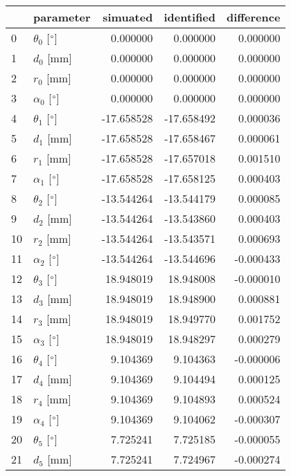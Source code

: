 \documentclass{standalone}%
\begin{document}
%
\normalsize%
\begin{tabular}{llrrr}
\toprule
{} &                 parameter &   simuated & identified & difference \\
\midrule
0  &  $\theta_{0}$ [$\degree$] &   0.000000 &   0.000000 &   0.000000 \\
1  &              $d_{0}$ [mm] &   0.000000 &   0.000000 &   0.000000 \\
2  &              $r_{0}$ [mm] &   0.000000 &   0.000000 &   0.000000 \\
3  &  $\alpha_{0}$ [$\degree$] &   0.000000 &   0.000000 &   0.000000 \\
4  &  $\theta_{1}$ [$\degree$] & -17.658528 & -17.658492 &   0.000036 \\
5  &              $d_{1}$ [mm] & -17.658528 & -17.658467 &   0.000061 \\
6  &              $r_{1}$ [mm] & -17.658528 & -17.657018 &   0.001510 \\
7  &  $\alpha_{1}$ [$\degree$] & -17.658528 & -17.658125 &   0.000403 \\
8  &  $\theta_{2}$ [$\degree$] & -13.544264 & -13.544179 &   0.000085 \\
9  &              $d_{2}$ [mm] & -13.544264 & -13.543860 &   0.000403 \\
10 &              $r_{2}$ [mm] & -13.544264 & -13.543571 &   0.000693 \\
11 &  $\alpha_{2}$ [$\degree$] & -13.544264 & -13.544696 &  -0.000433 \\
12 &  $\theta_{3}$ [$\degree$] &  18.948019 &  18.948008 &  -0.000010 \\
13 &              $d_{3}$ [mm] &  18.948019 &  18.948900 &   0.000881 \\
14 &              $r_{3}$ [mm] &  18.948019 &  18.949770 &   0.001752 \\
15 &  $\alpha_{3}$ [$\degree$] &  18.948019 &  18.948297 &   0.000279 \\
16 &  $\theta_{4}$ [$\degree$] &   9.104369 &   9.104363 &  -0.000006 \\
17 &              $d_{4}$ [mm] &   9.104369 &   9.104494 &   0.000125 \\
18 &              $r_{4}$ [mm] &   9.104369 &   9.104893 &   0.000524 \\
19 &  $\alpha_{4}$ [$\degree$] &   9.104369 &   9.104062 &  -0.000307 \\
20 &  $\theta_{5}$ [$\degree$] &   7.725241 &   7.725185 &  -0.000055 \\
21 &              $d_{5}$ [mm] &   7.725241 &   7.724967 &  -0.000274 \\

\end{tabular}
\end{document}
